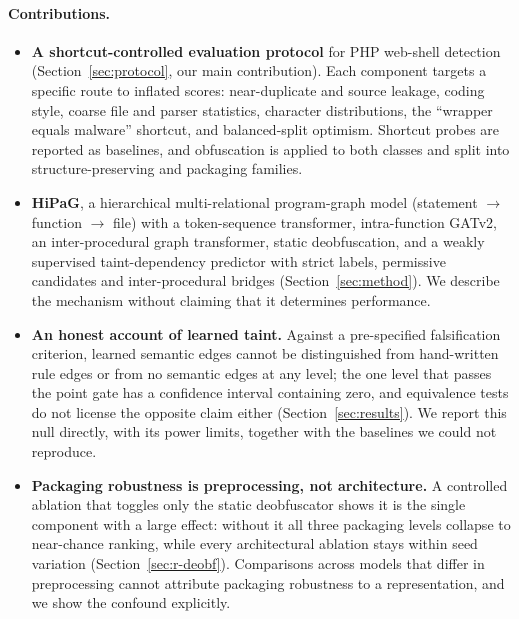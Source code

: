 \documentclass[pdflatex,sn-mathphys-num]{sn-jnl}
\begin{document}
\paragraph{Contributions.}
\begin{itemize}
  \item \textbf{A shortcut-controlled evaluation protocol} for PHP web-shell
  detection (Section~\ref{sec:protocol}, our main contribution). Each component
  targets a specific route to inflated scores: near-duplicate and source
  leakage, coding style, coarse file and parser statistics, character
  distributions, the ``wrapper equals malware'' shortcut, and balanced-split
  optimism. Shortcut probes are reported as baselines, and obfuscation is
  applied to both classes and split into structure-preserving and packaging
  families.
  \item \textbf{HiPaG}, a hierarchical multi-relational program-graph model
  (statement $\rightarrow$ function $\rightarrow$ file) with a token-sequence
  transformer, intra-function GATv2, an inter-procedural graph transformer,
  static deobfuscation, and a weakly supervised taint-dependency predictor with
  strict labels, permissive candidates and inter-procedural bridges
  (Section~\ref{sec:method}). We describe the mechanism without claiming that
  it determines performance.
  \item \textbf{An honest account of learned taint.} Against a pre-specified
  falsification criterion, learned semantic edges cannot be distinguished from
  hand-written rule edges or from no semantic edges at any level; the one level
  that passes the point gate has a confidence interval containing zero, and
  equivalence tests do not license the opposite claim either
  (Section~\ref{sec:results}). We report this null directly, with its power
  limits, together with the baselines we could not reproduce.
  \item \textbf{Packaging robustness is preprocessing, not architecture.} A
  controlled ablation that toggles only the static deobfuscator shows it is the
  single component with a large effect: without it all three packaging levels
  collapse to near-chance ranking, while every architectural ablation stays
  within seed variation (Section~\ref{sec:r-deobf}). Comparisons across models
  that differ in preprocessing cannot attribute packaging robustness to a
  representation, and we show the confound explicitly.
\end{itemize}

\end{document}
